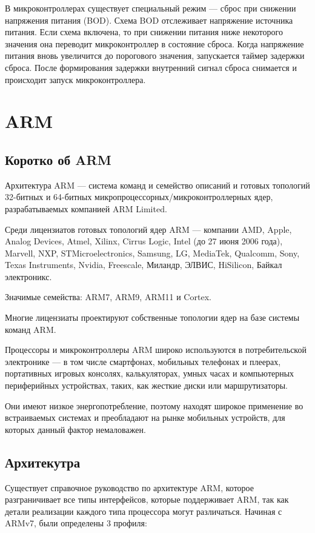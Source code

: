 \documentclass[12pt, oneside]{altsu-report}
\begin{document}
В микроконтроллерах существует специальный режим --- сброс при снижении напряжения питания (BOD). Схема BOD отслеживает напряжение источника питания. Если схема включена, то при снижении питания ниже некоторого значения она переводит микроконтроллер в состояние сброса. Когда напряжение питания вновь увеличится до порогового значения, запускается таймер задержки сброса. После формирования задержки внутренний сигнал сброса снимается и происходит запуск микроконтроллера.~\cite{kochegarov_trusov}

\section{ARM}

\subsection{Коротко об ARM}

Архитектура ARM --- система команд и семейство описаний и готовых топологий 32-битных и 64-битных микропроцессорных/микроконтроллерных ядер, разрабатываемых компанией ARM Limited.

Среди лицензиатов готовых топологий ядер ARM --- компании AMD, Apple, Analog Devices, Atmel, Xilinx, Cirrus Logic, Intel (до 27 июня 2006 года), Marvell, NXP, STMicroelectronics, Samsung, LG, MediaTek, Qualcomm, Sony, Texas Instruments, Nvidia, Freescale, Миландр, ЭЛВИС, HiSilicon, Байкал электроникс.

Значимые семейства: ARM7, ARM9, ARM11 и Cortex.

Многие лицензиаты проектируют собственные топологии ядер на базе системы команд ARM.

Процессоры и микроконтроллеры ARM широко используются в потребительской электронике --- в том числе смартфонах, мобильных телефонах и плеерах, портативных игровых консолях, калькуляторах, умных часах и компьютерных периферийных устройствах, таких, как жесткие диски или маршрутизаторы.

Они имеют низкое энергопотребление, поэтому находят широкое применение во встраиваемых системах и преобладают на рынке мобильных устройств, для которых данный фактор немаловажен.~\cite{wikiRUARM}

\subsection{Архитекутра}

Существует справочное руководство по архитектуре ARM, которое разграничивает все типы интерфейсов, которые поддерживает ARM, так как детали реализации каждого типа процессора могут различаться. Начиная с ARMv7, были определены 3 профиля:
\end{document}
